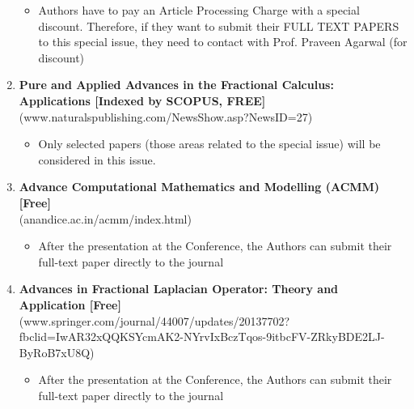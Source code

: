 \documentclass[twoside,11pt]{amsart}
\begin{document}
\begin{enumerate}
\begin{itemize}

\item Authors have to pay an Article Processing Charge with a special discount. Therefore, if they want to submit their FULL TEXT PAPERS to this special issue, they need to contact with Prof. Praveen Agarwal (for discount)

\end{itemize}

\item {\bf Pure and Applied Advances in the Fractional Calculus: Applications [Indexed by SCOPUS, FREE]}\\
(www.naturalspublishing.com/NewsShow.asp?NewsID=27)


\begin{itemize}

\item Only selected papers (those areas related to the special issue) will be considered in this issue.

\end{itemize}


\item {\bf Advance Computational Mathematics and Modelling (ACMM) [Free]}\\
(anandice.ac.in/acmm/index.html)


\begin{itemize}

\item After the presentation at the Conference, the Authors can submit their full-text paper directly to the journal

\end{itemize}



\item {\bf Advances in Fractional Laplacian Operator: Theory and Application [Free]}\\
(www.springer.com/journal/44007/updates/20137702?fbclid=IwAR32xQQKSYcmAK2-NYrvIxBczTqos-9itbcFV-ZRkyBDE2LJ-ByRoB7xU8Q)


\begin{itemize}

\item After the presentation at the Conference, the Authors can submit their full-text paper directly to the journal

\end{itemize}

\end{enumerate}






\newpage
\vskip1mm

\end{document}
